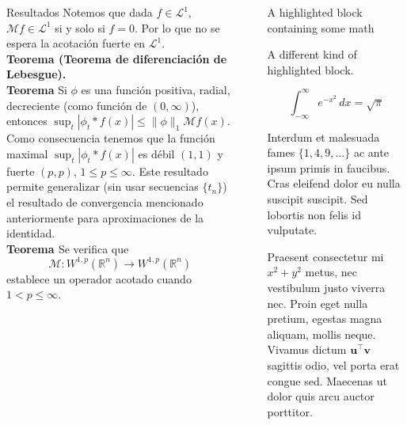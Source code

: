 \documentclass[final]{beamer}
\newlength{\sepwidth}
\newlength{\colwidth}
\newcommand{\separatorcolumn}{\begin{column}{\sepwidth}\end{column}}
\begin{document}
\begin{frame}[t]
\begin{columns}[t]
\begin{column}{\colwidth}
\begin{alertblock}{Resultados}
      \vspace{0.2cm}
      Notemos que dada $f\in \mathcal{L}^1$, $\mathcal{M}f \in \mathcal{L}^1$ si y solo si $f=0$. Por lo que no se espera la acotación fuerte en $\mathcal{L}^1$.\\
      \vspace{0.2cm}
    \textbf{Teorema (Teorema de diferenciación de Lebesgue).}\\
      \vspace{0.2cm}
    \textbf{Teorema} Si $\phi$ es una función positiva, radial, decreciente (como función de $(0,\infty)$), entonces $\sup_{t}|\phi_t\ast f(x)|\leq \|\phi\|_1\mathcal{M}f(x)$. Como consecuencia tenemos que la función maximal $\sup_{t}|\phi_t\ast f(x)|$ es débil $(1,1)$ y fuerte $(p,p)$, $1\leq p \leq \infty$. Este resultado permite generalizar (sin usar secuencias $\{t_n\}$) el resultado de convergencia mencionado anteriormente para aproximaciones de la identidad.\\ 
      \vspace{0.2cm}
      \textbf{Teorema \cite{MR1469106}} Se verifica  que
      \begin{equation*}
          \mathcal{M}:W^{1,p}(\mathbb{R}^n)\rightarrow W^{1,p}(\mathbb{R}^n) 
      \end{equation*}
      establece un operador acotado cuando $1<p\leq \infty$.
  \end{alertblock}

\end{column}

\separatorcolumn

\begin{column}{\colwidth}

  \begin{exampleblock}{A highlighted block containing some math}

    A different kind of highlighted block.

    $$
    \int_{-\infty}^{\infty} e^{-x^2}\,dx = \sqrt{\pi}
    $$

    Interdum et malesuada fames $\{1, 4, 9, \ldots\}$ ac ante ipsum primis in
    faucibus. Cras eleifend dolor eu nulla suscipit suscipit. Sed lobortis non
    felis id vulputate.


    Praesent consectetur mi $x^2 + y^2$ metus, nec vestibulum justo viverra
    nec. Proin eget nulla pretium, egestas magna aliquam, mollis neque. Vivamus
    dictum $\mathbf{u}^\intercal\mathbf{v}$ sagittis odio, vel porta erat
    congue sed. Maecenas ut dolor quis arcu auctor porttitor.


\end{exampleblock}
\end{column}
\end{columns}
\end{frame}
\end{document}
